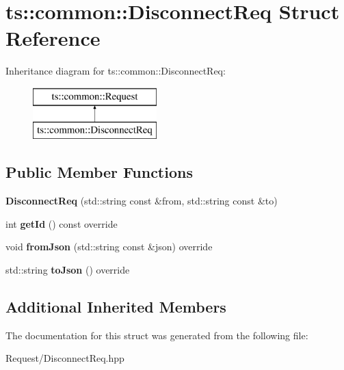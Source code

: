 \hypertarget{structts_1_1common_1_1_disconnect_req}{}\section{ts\+:\+:common\+:\+:Disconnect\+Req Struct Reference}
\label{structts_1_1common_1_1_disconnect_req}
Inheritance diagram for ts\+:\+:common\+:\+:Disconnect\+Req\+:\begin{figure}[H]
\begin{center}
\leavevmode
\includegraphics[height=2.000000cm]{structts_1_1common_1_1_disconnect_req}
\end{center}
\end{figure}
\subsection*{Public Member Functions}
\begin{DoxyCompactItemize}
\item 
\mbox{\label{structts_1_1common_1_1_disconnect_req_aae1dfdccf2f82711fea48c93d0653af5}} 
{\bfseries Disconnect\+Req} (std\+::string const \&from, std\+::string const \&to)
\item 
\mbox{\label{structts_1_1common_1_1_disconnect_req_ad2c5dcc48f4e0ee16cb2846e1506e00f}} 
int {\bfseries get\+Id} () const override
\item 
\mbox{\label{structts_1_1common_1_1_disconnect_req_a3aa29c9e0f95bce40931dcece2a82ab6}} 
void {\bfseries from\+Json} (std\+::string const \&json) override
\item 
\mbox{\label{structts_1_1common_1_1_disconnect_req_af5496ad4f4a042827bc38fd57b71bc60}} 
std\+::string {\bfseries to\+Json} () override
\end{DoxyCompactItemize}
\subsection*{Additional Inherited Members}


The documentation for this struct was generated from the following file\+:\begin{DoxyCompactItemize}
\item 
Request/Disconnect\+Req.\+hpp\end{DoxyCompactItemize}
